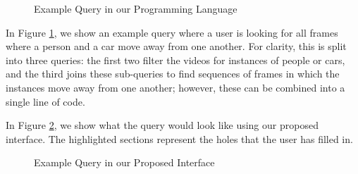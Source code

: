 \begin{figure}
    \caption{Example Query in our Programming Language}
    \label{fig:Map1}
\end{figure}

In Figure \ref{fig:Map1}, we show an example query where a user is looking for all frames where a person and a car move away from one another. 
For clarity, this is split into three queries: the first two filter the videos for instances of people or cars, and the third joins these sub-queries to find sequences of frames in which the instances move away from one another; however, these can be combined into a single line of code.

In Figure \ref{fig:UI1}, we show what the query would look like using our proposed interface.
The highlighted sections represent the holes that the user has filled in.

\begin{figure}[H]
    \caption{Example Query in our Proposed Interface}
    \label{fig:UI1}
\end{figure}

